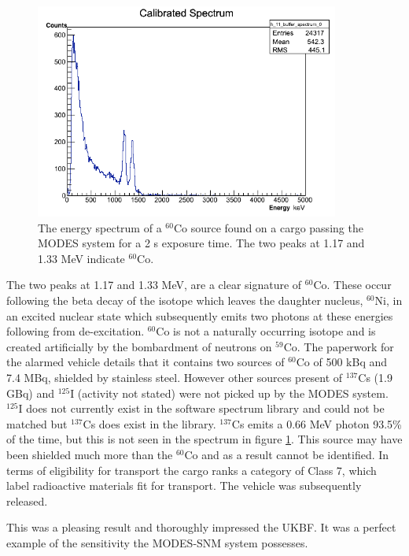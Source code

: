 \begin{figure}
\begin{center}
\includegraphics[width=100mm]{./Chapter7/figures/co60Gamma01Container060514-1120_2sExposure.png}
\end{center}
\caption{The energy spectrum of a $^{60}$Co source found on a cargo passing the MODES system for a 2 s exposure time. The two peaks at 1.17 and 1.33 MeV indicate $^{60}$Co.}
\label{fig:cobalt60OnTruck}
\end{figure}

The two peaks at 1.17 and 1.33 MeV, are a clear signature of $^{60}$Co. These occur following the beta decay of the isotope which leaves the daughter nucleus, $^{60}$Ni, in an excited nuclear state which subsequently emits two photons at these energies following from de-excitation. $^{60}$Co is not a naturally occurring isotope and is created artificially by the bombardment of neutrons on $^{59}$Co. The paperwork for the alarmed vehicle details that it contains two sources of $^{60}$Co of 500 kBq and 7.4 MBq, shielded by stainless steel. However other sources present of $^{137}$Cs (1.9 GBq) and $^{125}$I (activity not stated) were not picked up by the MODES system. $^{125}$I does not currently exist in the software spectrum library and could not be matched but $^{137}$Cs does exist in the library. $^{137}$Cs emits a 0.66 MeV photon 93.5\% of the time, but this is not seen in the spectrum in figure \ref{fig:cobalt60OnTruck}. This source may have been shielded much more than the $^{60}$Co and as a result cannot be identified. In terms of eligibility for transport the cargo ranks a category of Class 7, which label radioactive materials fit for transport. The vehicle was subsequently released.

This was a pleasing result and thoroughly impressed the UKBF. It was a perfect example of the sensitivity the MODES-SNM system possesses. 

